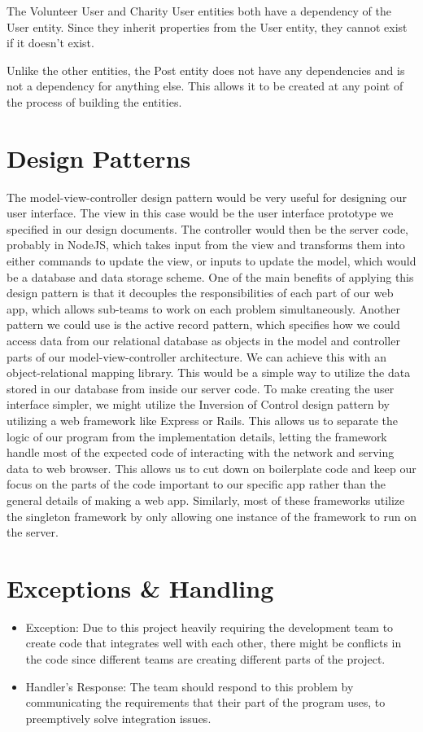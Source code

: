 \documentclass[12pt]{article}
\begin{document}
The Volunteer User and Charity User entities both have a dependency of the User entity.
Since they inherit properties from the User entity, they cannot exist if it doesn't exist.

Unlike the other entities, the Post entity does not have any dependencies and is not a
dependency for anything else. This allows it to be created at any point of the process of
building the entities.
\section{Design Patterns}
The model-view-controller design pattern would be very useful for designing our user
interface. The view in this case would be the user interface prototype we specified in our
design documents. The controller would then be the server code, probably in NodeJS, which
takes input from the view and transforms them into either commands to update the view, or
inputs to update the model, which would be a database and data storage scheme. One of the
main benefits of applying this design pattern is that it decouples the responsibilities of
each part of our web app, which allows sub-teams to work on each problem simultaneously.
Another pattern we could use is the active record pattern, which specifies how we could
access data from our relational database as objects in the model and controller parts of
our model-view-controller architecture. We can achieve this with an object-relational
mapping library. This would be a simple way to utilize the data stored in our database
from inside our server code. To make creating the user interface simpler, we might utilize
the Inversion of Control design pattern by utilizing a web framework like Express or
Rails. This allows us to separate the logic of our program from the implementation
details, letting the framework handle most of the expected code of interacting with the
network and serving data to web browser. This allows us to cut down on boilerplate code
and keep our focus on the parts of the code important to our specific app rather than the
general details of making a web app. Similarly, most of these frameworks utilize the
singleton framework by only allowing one instance of the framework to run on the server.
\section{Exceptions \& Handling}
\begin{itemize}
\item
	Exception: Due to this project heavily requiring the development team to create
	code that integrates well with each other, there might be conflicts in the code
	since different teams are creating different parts of the project.
\item
	Handler's Response: The team should respond to this problem by communicating the
	requirements that their part of the program uses, to preemptively solve
	integration issues.
\end{itemize}
\end{document}
